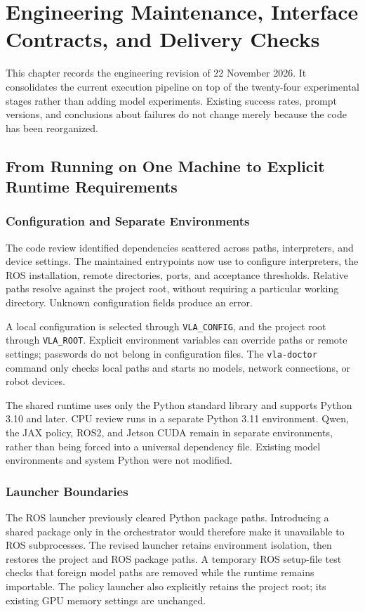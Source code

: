 \chapter{Engineering Maintenance, Interface Contracts, and Delivery Checks}
\label{ch:engineering}
This chapter records the engineering revision of 22 November 2026. It consolidates the current execution pipeline on top of the twenty-four experimental stages rather than adding model experiments. Existing success rates, prompt versions, and conclusions about failures do not change merely because the code has been reorganized.

\section{From Running on One Machine to Explicit Runtime Requirements}
\subsection{Configuration and Separate Environments}
The code review identified dependencies scattered across paths, interpreters, and device settings. The maintained entrypoints now use  to configure interpreters, the ROS installation, remote directories, ports, and acceptance thresholds. Relative paths resolve against the project root, without requiring a particular working directory. Unknown configuration fields produce an error.

A local configuration is selected through \texttt{VLA\_CONFIG}, and the project root through \texttt{VLA\_ROOT}. Explicit environment variables can override paths or remote settings; passwords do not belong in configuration files. The \texttt{vla-doctor} command only checks local paths and starts no models, network connections, or robot devices.

The shared runtime uses only the Python standard library and supports Python 3.10 and later. CPU review runs in a separate Python 3.11 environment. Qwen, the JAX policy, ROS2, and Jetson CUDA remain in separate environments, rather than being forced into a universal dependency file. Existing model environments and system Python were not modified.

\subsection{Launcher Boundaries}
The ROS launcher previously cleared Python package paths. Introducing a shared package only in the orchestrator would therefore make it unavailable to ROS subprocesses. The revised launcher retains environment isolation, then restores the project and ROS package paths. A temporary ROS setup-file test checks that foreign model paths are removed while the runtime remains importable. The policy launcher also explicitly retains the project root; its existing GPU memory settings are unchanged.


